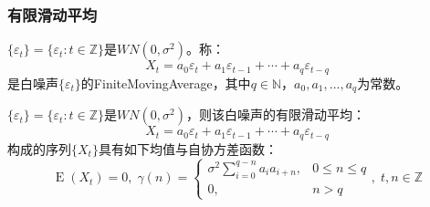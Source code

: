 \subsubsection{有限滑动平均}
\begin{definition}
	$\{\varepsilon_t\}=\{\varepsilon_t:t\in\mathbb{Z}\}$是$WN(0,\sigma^2)$。称：
	\begin{equation*}
		X_t=a_0\varepsilon_t+a_1\varepsilon_{t-1}+\cdots+a_q\varepsilon_{t-q}
	\end{equation*}
	是白噪声$\{\varepsilon_t\}$的\gls{FiniteMovingAverage}，其中$q\in\mathbb{N}$，$a_0,a_1,\dots,a_q$为常数。
\end{definition}
\begin{theorem}
	$\{\varepsilon_t\}=\{\varepsilon_t:t\in\mathbb{Z}\}$是$WN(0,\sigma^2)$，则该白噪声的有限滑动平均：
	\begin{equation*}
		X_t=a_0\varepsilon_t+a_1\varepsilon_{t-1}+\cdots+a_q\varepsilon_{t-q}
	\end{equation*}
	构成的序列$\{X_t\}$具有如下均值与自协方差函数：
	\begin{equation*}
		\operatorname{E}(X_t)=0,\;
		\gamma(n)=
		\begin{cases}
			\sigma^2\sum\limits_{i=0}^{q-n}a_ia_{i+n}, & 0\leqslant n\leqslant q \\
			0, & n>q
		\end{cases},\;t,n\in\mathbb{Z}
	\end{equation*}
\end{theorem}
